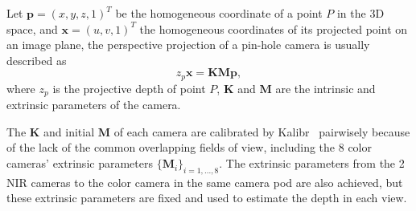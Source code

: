 Let $\mathbf{p}=(x,y,z,1)^{T}$ be the homogeneous coordinate of a point $P$ in the 3D space, and $\mathbf{x}=(u,v,1)^{T}$ the homogeneous coordinates of its projected point on an image plane, the perspective projection of a pin-hole camera is usually described as
\begin{equation}
z_{p}\mathbf{x}=\mathbf{K}\mathbf{M}\mathbf{p},
\end{equation}
where $z_{p}$ is the projective depth of point $P$, $\mathbf{K}$ and $\mathbf{M}$ are the intrinsic and extrinsic parameters of the camera.

The $\mathbf{K}$ and initial $\mathbf{M}$ of each camera are calibrated by Kalibr~\cite{Maye2013Self} pairwisely because of the lack of the common overlapping fields of view, including the 8 color cameras' extrinsic parameters $\{\mathbf{M}_{i}\}_{i=1,...,8}$. The extrinsic parameters from the 2 NIR cameras to the color camera in the same camera pod are also achieved, but these extrinsic parameters are fixed and used to estimate the depth in each view.


